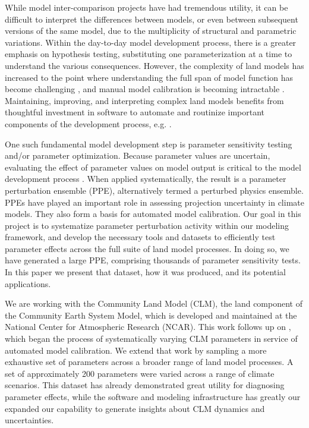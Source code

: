 \documentclass[draft]{agujournal2019}
\begin{document}
While model inter-comparison projects have had tremendous utility, it can be difficult to interpret the differences between models, or even between subsequent versions of the same model, due to the multiplicity of structural and parametric variations.
Within the day-to-day model development process, there is a greater emphasis on hypothesis testing, substituting one parameterization at a time to understand the various consequences.
However, the complexity of land models has increased to the point where understanding the full span of model function has become challenging \cite{fisher2020}, and manual model calibration is becoming intractable \cite{dagon2020}.
Maintaining, improving, and interpreting complex land models benefits from thoughtful investment in software to automate and routinize important components of the development process, e.g. . 

One such fundamental model development step is parameter sensitivity testing and/or parameter optimization.
Because parameter values are uncertain, evaluating the effect of parameter values on model output is critical to the model development process \cite{hourdin2017}.
When applied systematically, the result is a parameter perturbation ensemble (PPE), alternatively termed a perturbed physics ensemble.
PPEs have played an important role in assessing projection uncertainty in climate models.
They also form a basis for automated model calibration.
Our goal in this project is to systematize parameter perturbation activity within our modeling framework, and develop the necessary tools and datasets to efficiently test parameter effects across the full suite of land model processes. 
In doing so, we have generated a large PPE, comprising thousands of parameter sensitivity tests.
In this paper we present that dataset, how it was produced, and its potential applications.

We are working with the Community Land Model (CLM), the land component of the Community Earth System Model, which is developed and maintained at the National Center for Atmospheric Research (NCAR).
This work follows up on , which began the process of systematically varying CLM parameters in service of automated model calibration.
We extend that work by sampling a more exhaustive set of parameters across a broader range of land model processes.
A set of approximately 200 parameters were varied across a range of climate scenarios.
This dataset has already demonstrated great utility for diagnosing parameter effects, while the software and modeling infrastructure has greatly our expanded our capability to generate insights about CLM dynamics and uncertainties.
\end{document}

